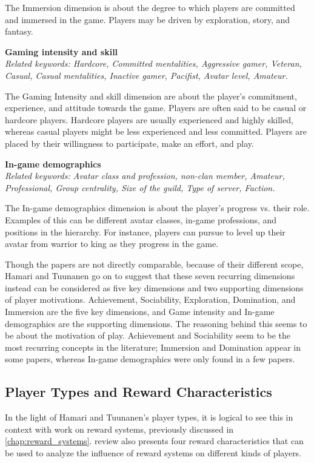 The Immersion dimension is about the degree to which players are committed and immersed in the game. Players may be driven by exploration, story, and fantasy. 
    
\textbf{Gaming intensity and skill}\\
\textit{Related keywords: Hardcore, Committed mentalities, Aggressive gamer, Veteran, Casual, Casual mentalities, Inactive gamer, Pacifist, Avatar level, Amateur.}

The Gaming Intensity and skill dimension are about the player’s commitment, experience, and attitude towards the game. Players are often said to be casual or hardcore players. Hardcore players are usually experienced and highly skilled, whereas casual players might be less experienced and less committed.  Players are placed by their willingness to participate, make an effort, and play.
    
\textbf{In-game demographics}\\
\textit{Related keywords: Avatar class and profession, non-clan member, Amateur, Professional, Group centrality, Size of the guild, Type of server, Faction.}

The In-game demographics dimension is about the player’s progress vs. their role. Examples of this can be different avatar classes, in-game professions, and positions in the hierarchy. For instance, players can pursue to level up their avatar from warrior to king as they progress in the game.

Though the papers are not directly comparable, because of their different scope, Hamari and Tuunanen go on to suggest that these seven recurring dimensions instead can be considered as five key dimensions and two supporting dimensions of player motivations. Achievement, Sociability, Exploration, Domination, and Immersion are the five key dimensions, and Game intensity and In-game demographics are the supporting dimensions. The reasoning behind this seems to be about the motivation of play. Achievement and Sociability seem to be the most recurring concepts in the literature; Immersion and Domination appear in some papers, whereas In-game demographics were only found in a few papers.

\subsection{Player Types and Reward Characteristics}
In the light of Hamari and Tuunanen’s player types, it is logical to see this in context with \citet{wang_game_2011} work on reward systems, previously discussed in \ref{chap:reward_systems}. \citet{wang_game_2011} review also presents four reward characteristics that can be used to analyze the influence of reward systems on different kinds of players.

